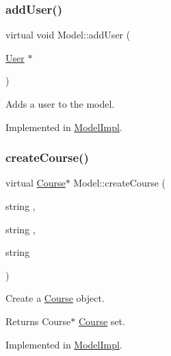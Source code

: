 \mbox{\label{classModel_ab6bf3b0428a4b087e8126c4b203bfc45}} 
\subsubsection{\texorpdfstring{add\+User()}{addUser()}}
{\footnotesize\ttfamily virtual void Model\+::add\+User (\begin{DoxyParamCaption}\item[{\hyperlink{classUser}{User} $\ast$}]{ }\end{DoxyParamCaption})\hspace{0.3cm}{\ttfamily [pure virtual]}}



Adds a user to the model. 



Implemented in \hyperlink{classModelImpl_aa0c7acd29ab42d13227e0e85fea044c8}{Model\+Impl}.

\mbox{\label{classModel_ab62d035cd5240332e249d39ff9f98f9a}} 
\subsubsection{\texorpdfstring{create\+Course()}{createCourse()}}
{\footnotesize\ttfamily virtual \hyperlink{classCourse}{Course}$\ast$ Model\+::create\+Course (\begin{DoxyParamCaption}\item[{string}]{,  }\item[{string}]{,  }\item[{string}]{ }\end{DoxyParamCaption})\hspace{0.3cm}{\ttfamily [pure virtual]}}



Create a \hyperlink{classCourse}{Course} object. 

\begin{DoxyReturn}{Returns}
Course$\ast$ \hyperlink{classCourse}{Course} set. 
\end{DoxyReturn}


Implemented in \hyperlink{classModelImpl_a9bcdb7f3c69ac4f86f253a9422ae6ce9}{Model\+Impl}.

\mbox{\label{classModel_accd28300871325fce68d551cebf27220}} 
